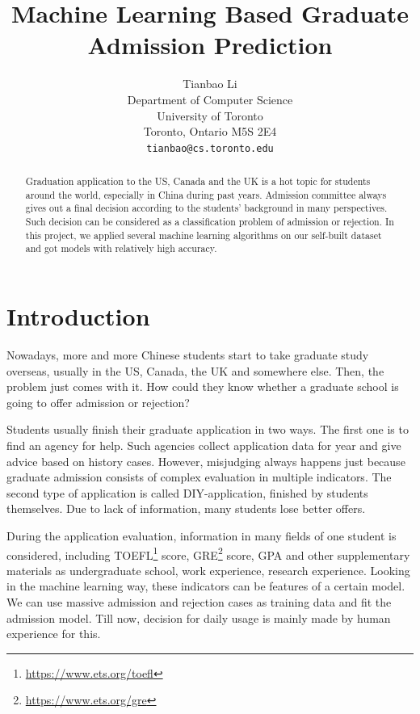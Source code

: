 \documentclass{article}
\title{Machine Learning Based Graduate Admission Prediction}
\author{
  Tianbao Li\\
  Department of Computer Science\\
  University of Toronto\\
  Toronto, Ontario M5S 2E4\\
  \texttt{tianbao@cs.toronto.edu} \\
}
\begin{document}

\maketitle

\begin{abstract}
Graduation application to the US, Canada and the UK is a hot topic for students around the world, especially in China during past years. Admission committee always gives out a final decision according to the students' background in many perspectives. Such decision can be considered as a classification problem of admission or rejection. In this project, we applied several machine learning algorithms on our self-built dataset and got models with relatively high accuracy.
\end{abstract}

\section{Introduction}

Nowadays, more and more Chinese students start to take graduate study overseas, usually in the US, Canada, the UK and somewhere else. Then, the problem just comes with it. How could they know whether a graduate school is going to offer admission or rejection?

Students usually finish their graduate application in two ways. The first one is to find an agency for help. Such agencies collect application data for year and give advice based on history cases. However, misjudging always happens just because graduate admission consists of complex evaluation in multiple indicators. The second type of application is called DIY-application, finished by students themselves. Due to lack of information, many students lose better offers.

During the application evaluation, information in many fields of one student is considered, including TOEFL\footnote{\url{https://www.ets.org/toefl}} score, GRE\footnote{\url{https://www.ets.org/gre}} score, GPA and other supplementary materials as undergraduate school, work experience, research experience. Looking in the machine learning way, these indicators can be features of a certain model. We can use massive admission and rejection cases as training data and fit the admission model. Till now, decision for daily usage is mainly made by human experience for this.
\end{document}
